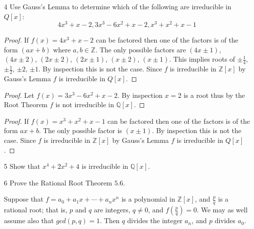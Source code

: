 \begin{problem}{4}
    Use Gauss's Lemma to determine which of the following 
    are irreducible in $Q[x]$:
    \[4x^3 + x - 2, 3x^3 - 6x^2 + x - 2, x^3 + x^2 + x - 1\]
\end{problem}
\solved

\begin{proof}
    If $f(x) = 4x^3 + x - 2$ can be factored then one of 
        the factors is of the form $(ax + b)$
        where $a, b \in \mathbb{Z}$.
    The only possible factors are 
        $(4x \pm 1)$, $(4x \pm 2)$, $(2x \pm 2)$, $(2x \pm 1)$, $(x \pm 2)$, $(x \pm 1)$.
    This implies roots of $\pm \frac{1}{4}$, $\pm \frac{1}{2}$, $\pm 2$, $\pm 1$.
    By inspection this is not the case.
    Since $f$ is irreducible in $\mathbb{Z}[x]$ by Gauss's Lemma $f$ is irreducible in $Q[x]$.
\end{proof}

\begin{proof}
    Let $f(x) =  3x^3 - 6x^2 + x - 2$.
    By inspection $x = 2$ is a root thus by the Root Theorem 
        $f$ is not irreducible in $\mathbb{Q}[x]$.
\end{proof}

\begin{proof}
    If $f(x) =  x^3 + x^2 + x - 1$ can be factored then one of 
        the factors is of the form $ax + b$.
    The only possible factor is $(x \pm 1)$.
    By inspection this is not the case.
    Since $f$ is irreducible in $\mathbb{Z}[x]$ by Gauss's Lemma $f$ is irreducible in $Q[x]$.
\end{proof}

\begin{problem}{5}
    Show that $x^4 + 2x^2 + 4$ is irreducible in $\mathbb{Q}[x]$.
\end{problem}
\unsolved

\begin{problem}{6}
    Prove the Rational Root Theorem $5.6$.
\end{problem}
\solved

\begin{theorem}
    Suppose that $f = a_0 + a_1 x + \cdots + a_n x^n$
    is a polynomial in $\mathbb{Z}[x]$, and $\frac{p}{q}$ is 
    a rational root; that is, $p$ and $q$ are integers, $q \ne 0$,
    and $f\left(\frac{p}{q}\right) = 0$. We may as well assume also that 
    $gcd(p, q) = 1$. Then $q$ divides the integer $a_n$, and 
    $p$ divides $a_0$.
\end{theorem}

